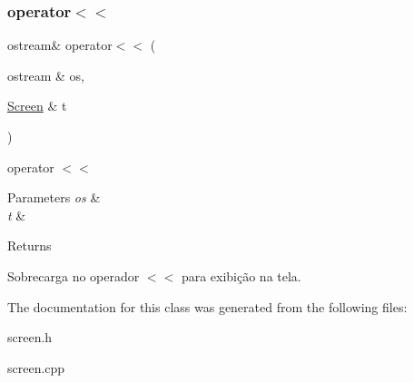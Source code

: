 \subsubsection{\texorpdfstring{operator$<$$<$}{operator<<}}
{\footnotesize\ttfamily ostream\& operator$<$$<$ (\begin{DoxyParamCaption}\item[{ostream \&}]{os,  }\item[{\hyperlink{classScreen}{Screen} \&}]{t }\end{DoxyParamCaption})\hspace{0.3cm}{\ttfamily [friend]}}



operator $<$$<$ 


\begin{DoxyParams}{Parameters}
{\em os} & \\
\hline
{\em t} & \\
\hline
\end{DoxyParams}
\begin{DoxyReturn}{Returns}

\end{DoxyReturn}
Sobrecarga no operador $<$$<$ para exibição na tela. 

The documentation for this class was generated from the following files\+:\begin{DoxyCompactItemize}
\item 
screen.\+h\item 
screen.\+cpp\end{DoxyCompactItemize}
